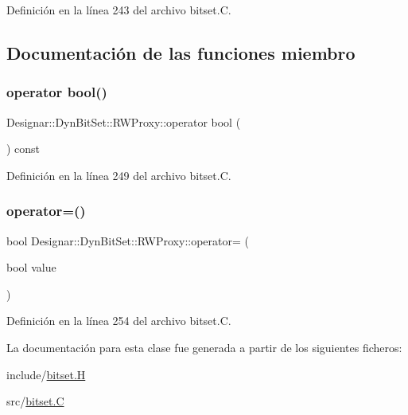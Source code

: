 Definición en la línea 243 del archivo bitset.\+C.



\subsection{Documentación de las funciones miembro}
\mbox{\label{class_designar_1_1_dyn_bit_set_1_1_r_w_proxy_ae2b7bc44f30f8b75d8fc2306167f9598}} 
\subsubsection{\texorpdfstring{operator bool()}{operator bool()}}
{\footnotesize\ttfamily Designar\+::\+Dyn\+Bit\+Set\+::\+R\+W\+Proxy\+::operator bool (\begin{DoxyParamCaption}{ }\end{DoxyParamCaption}) const}



Definición en la línea 249 del archivo bitset.\+C.

\mbox{\label{class_designar_1_1_dyn_bit_set_1_1_r_w_proxy_ad9dff242f5550a97af94c1e4ecd163ad}} 
\subsubsection{\texorpdfstring{operator=()}{operator=()}}
{\footnotesize\ttfamily bool Designar\+::\+Dyn\+Bit\+Set\+::\+R\+W\+Proxy\+::operator= (\begin{DoxyParamCaption}\item[{bool}]{value }\end{DoxyParamCaption})}



Definición en la línea 254 del archivo bitset.\+C.



La documentación para esta clase fue generada a partir de los siguientes ficheros\+:\begin{DoxyCompactItemize}
\item 
include/\hyperlink{bitset_8_h}{bitset.\+H}\item 
src/\hyperlink{bitset_8_c}{bitset.\+C}\end{DoxyCompactItemize}
